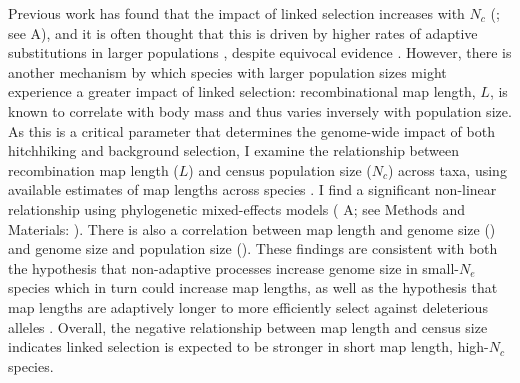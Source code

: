 \documentclass[9pt,lineno]{elife}
\begin{document}
Previous work has found that the impact of linked selection increases with
$N_c$ (\cite{Corbett-Detig2015-gt}; see A), and it
is often thought that this is driven by higher rates of adaptive substitutions
in larger populations \citep{Ohta1992-yi}, despite equivocal evidence
\citep{Galtier2016-dq}.  However, there is another mechanism by which species
with larger population sizes might experience a greater impact of linked
selection: recombinational map length, $L$, is known to correlate with body
mass \citep{Burt1987-tq} and thus varies inversely with population size. As
this is a critical parameter that determines the genome-wide impact of both
hitchhiking and background selection, I examine the relationship between
recombination map length ($L$) and census population size ($N_c$) across taxa,
using available estimates of map lengths across species
\citep{Stapley2017-fs,Corbett-Detig2015-gt}. I find a significant non-linear
relationship using phylogenetic mixed-effects models ( A; see
Methods and Materials: ).  There is also a correlation
between map length and genome size () and
genome size and population size (). These
findings are consistent with both the hypothesis that non-adaptive processes
increase genome size in small-$N_e$ species \citep{Lynch2003-bn} which in turn
could increase map lengths, as well as the hypothesis that map lengths are
adaptively longer to more efficiently select against deleterious alleles
\citep{Roze2021-ya}.  Overall, the negative relationship between map length and
census size indicates linked selection is expected to be stronger in short map
length, high-$N_c$ species.
\end{document}
